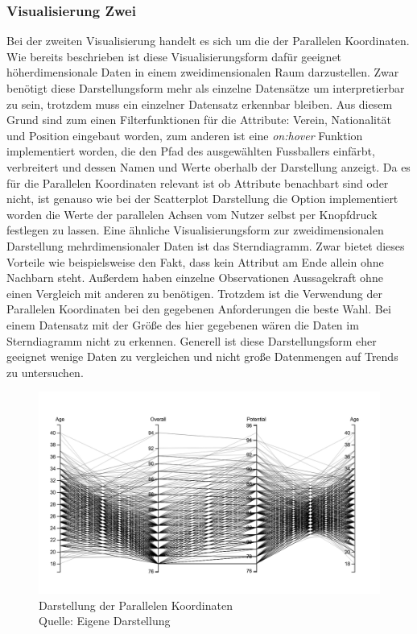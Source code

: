 \documentclass[usegeometry=true]{scrartcl}
\begin{document}
\subsubsection{Visualisierung Zwei}
Bei der zweiten Visualisierung handelt es sich um die der Parallelen Koordinaten. 
Wie bereits beschrieben ist diese Visualisierungsform dafür geeignet höherdimensionale Daten in einem zweidimensionalen Raum darzustellen. Zwar benötigt diese Darstellungsform mehr als einzelne Datensätze um interpretierbar zu sein, trotzdem muss ein einzelner Datensatz erkennbar bleiben. Aus diesem Grund sind zum einen Filterfunktionen für die Attribute: Verein, Nationalität und Position eingebaut worden, zum anderen ist eine \textit{on:hover} Funktion implementiert worden, die den Pfad des ausgewählten Fussballers einfärbt, verbreitert und dessen Namen und Werte oberhalb der Darstellung anzeigt.
Da es für die Parallelen Koordinaten relevant ist ob Attribute benachbart sind oder nicht, ist genauso wie bei der Scatterplot Darstellung die Option implementiert worden die Werte der parallelen Achsen vom Nutzer selbst per Knopfdruck festlegen zu lassen.
Eine ähnliche Visualisierungsform zur zweidimensionalen Darstellung mehrdimensionaler Daten ist das Sterndiagramm. Zwar bietet dieses Vorteile wie beispielsweise den Fakt, dass kein Attribut am Ende allein ohne Nachbarn steht. Außerdem haben einzelne Observationen Aussagekraft ohne einen Vergleich mit anderen zu benötigen. Trotzdem ist die Verwendung der Parallelen Koordinaten bei den gegebenen Anforderungen die beste Wahl. Bei einem Datensatz mit der Größe des hier gegebenen wären die Daten im Sterndiagramm nicht zu erkennen. Generell ist diese Darstellungsform eher geeignet wenige Daten zu vergleichen und nicht große Datenmengen auf Trends zu untersuchen. 

\begin{figure}[h!]
\centering
\includegraphics[scale=0.4]{grafiken/ParalleleKoordinaten1}
\caption{Darstellung der Parallelen Koordinaten\\ Quelle: Eigene Darstellung}
\end{figure}
\end{document}
